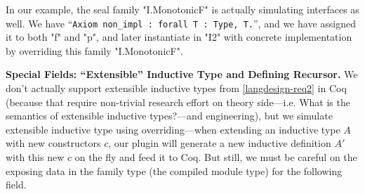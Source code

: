 In our example, the seal family "I.MonotonicF" is actually simulating
interfaces as well.  We have
\mbox{``\texttt{Axiom non_impl : forall {T : Type}, T.}''},
and we have assigned it to both "f" and "p", and later instantiate in
"I2" with concrete implementation by overriding this family
"I.MonotonicF".



\textbf{Special Fields: ``Extensible'' Inductive Type and Defining Recursor.}
We don't actually support extensible inductive types from
\ref{langdesign-req2} in Coq (because that require non-trivial research
effort on theory side---i.e. {What is the semantics of extensible
inductive types?}---and engineering), but we simulate extensible
inductive type using overriding---when extending an inductive type $A$
with new constructors $c$, our plugin will generate a new inductive
definition $A'$ with this new $c$ on the fly and feed it to Coq.  But
still, we must be careful on the exposing data in the family type (the
compiled module type) for the following field.  

